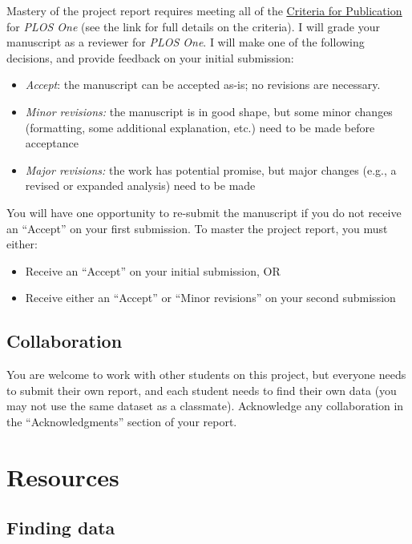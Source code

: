 \documentclass[11pt]{article}
\begin{document}
\noindent Mastery of the project report requires meeting all of the \href{https://journals.plos.org/plosone/s/journal-information#loc-criteria-for-publication}{\underline{Criteria for Publication}} for \textit{PLOS One} (see the link for full details on the criteria). I will grade your manuscript as a reviewer for \textit{PLOS One}. I will make one of the following decisions, and provide feedback on your initial submission:
\begin{itemize}
\item \textit{Accept}: the manuscript can be accepted as-is; no revisions are necessary.

\item \textit{Minor revisions:} the manuscript is in good shape, but some minor changes (formatting, some additional explanation, etc.) need to be made before acceptance

\item \textit{Major revisions:} the work has potential promise, but major changes (e.g., a revised or expanded analysis) need to be made
\end{itemize}

\noindent You will have one opportunity to re-submit the manuscript if you do not receive an ``Accept'' on your first submission. To master the project report, you must either:
\begin{itemize}
\item Receive an ``Accept'' on your initial submission, OR
\item Receive either an ``Accept'' or ``Minor revisions'' on your second submission
\end{itemize}

\subsection*{Collaboration}

You are welcome to work with other students on this project, but everyone needs to submit their own report, and each student needs to find their own data (you may not use the same dataset as a classmate). Acknowledge any collaboration in the ``Acknowledgments'' section of your report.

\section*{Resources}

\subsection*{Finding data}
\end{document}
